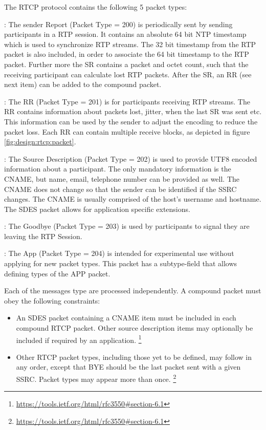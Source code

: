 The RTCP protocol contains the following 5 packet types:
\begin{itemize}
	: The sender Report (Packet Type = 200) is periodically sent by sending participants in a RTP session. It contains an absolute 64 bit NTP timestamp which is used to synchronize RTP streams. The 32 bit timestamp from the RTP packet is also included, in order to associate the 64 bit timestamp to the RTP packet. Further more the SR contains a packet and octet count, such that the receiving participant can calculate lost RTP packets. After the SR, an RR (see next item) can be added to the compound packet.

	: The RR (Packet Type = 201) is for participants receiving RTP streams. The RR contains information about packets lost, jitter, when the last SR was sent etc. This information can be used by the sender to adjust the encoding to reduce the packet loss. Each RR can contain multiple receive blocks, as depicted in figure \ref{fig:design:rtcp:packet}.

	: The Source Description (Packet Type = 202) is used to provide UTF8 encoded information about a participant. The only mandatory information is the \ac{CNAME}, but name, email, telephone number can be provided as well. The CNAME does not change so that the sender can be identified if the SSRC changes. The CNAME is usually comprised of the host's username and hostname. The SDES packet allows for application specific extensions. 

	: The Goodbye (Packet Type = 203) is used by participants to signal they are leaving the RTP Session. 
	
	: The App (Packet Type = 204) is intended for experimental use without applying for new packet types. This packet has a subtype-field that allows defining types of the APP packet. 
\end{itemize}

Each of the messages type are processed independently.
A compound packet must obey the following constraints:

\begin{itemize}     
    \item An SDES packet containing a CNAME item must be included in each compound RTCP packet. Other source description items may optionally be included if required by an application. \footnote{\url{https://tools.ietf.org/html/rfc3550\#section-6.1}}
      
    \item Other RTCP packet types, including those yet to be defined, may follow in any order, except that BYE should be the last packet sent with a given SSRC. Packet types may appear more than once. \footnote{\url{https://tools.ietf.org/html/rfc3550\#section-6.1}}
\end{itemize}


